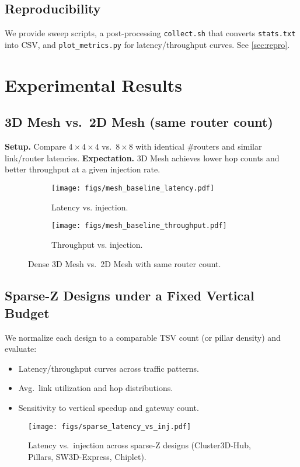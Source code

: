 \documentclass[11pt]{article}
\begin{document}
\subsection{Reproducibility}
We provide sweep scripts, a post-processing \texttt{collect.sh} that converts \texttt{stats.txt} into CSV, and \texttt{plot\_metrics.py} for latency/throughput curves. See \cref{sec:repro}.

\section{Experimental Results}
\subsection{3D Mesh vs.\ 2D Mesh (same router count)}
\label{sec:mesh-baseline}
\textbf{Setup.} Compare $4{\times}4{\times}4$ vs.\ $8{\times}8$ with identical \#routers and similar link/router latencies. \textbf{Expectation.} 3D Mesh achieves lower hop counts and better throughput at a given injection rate.

\begin{figure}[h]
  \centering
  \begin{subfigure}{0.48\linewidth}
    \texttt{[image: figs/mesh\_baseline\_latency.pdf]}
    \caption{Latency vs. injection.}
  \end{subfigure}
  \hfill
  \begin{subfigure}{0.48\linewidth}
    \texttt{[image: figs/mesh\_baseline\_throughput.pdf]}
    \caption{Throughput vs. injection.}
  \end{subfigure}
  \caption{Dense 3D Mesh vs.\ 2D Mesh with same router count.}
  \label{fig:mesh-baseline}
\end{figure}

\subsection{Sparse-Z Designs under a Fixed Vertical Budget}
\label{sec:sparse-results}
We normalize each design to a comparable TSV count (or pillar density) and evaluate:
\begin{itemize}[leftmargin=1em]
  \item Latency/throughput curves across traffic patterns.
  \item Avg.\ link utilization and hop distributions.
  \item Sensitivity to vertical speedup and gateway count.
\end{itemize}
\begin{figure}[h]
  \centering
  \texttt{[image: figs/sparse\_latency\_vs\_inj.pdf]}
  \caption{Latency vs.\ injection across sparse-Z designs (Cluster3D-Hub, Pillars, SW3D-Express, Chiplet).}
  \label{fig:sparse-latency}
\end{figure}
\end{document}
